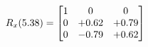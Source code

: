 \documentclass[preview]{standalone}
\begin{document}
\begin{align*}
\special{dvisvgm:raw <g id='unique000'>}R_{x}(5.38) = \begin{bmatrix}1 & 0 & 0 \\0 & +0.62 & +0.79 \\0 & -0.79 & +0.62\end{bmatrix}\special{dvisvgm:raw </g>}
\end{align*}
\end{document}
